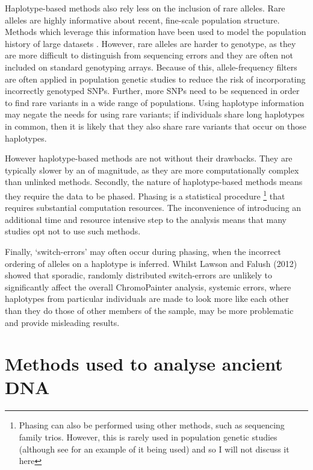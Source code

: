 Haplotype-based methods also rely less on the inclusion of rare alleles. Rare alleles are highly informative about recent, fine-scale population structure. Methods which leverage this information have been used to model the population history of large datasets \cite{schiffels2016iron, gravel2011demographic, o2015rare}. However, rare alleles are harder to genotype, as they are more difficult to distinguish from sequencing errors and they are often not included on standard genotyping arrays. Because of this, allele-frequency filters are often applied in population genetic studies to reduce the risk of incorporating incorrectly genotyped SNPs. Further, more SNPs need to be sequenced in order to find rare variants in a wide range of populations. Using haplotype information may negate the needs for using rare variants; if individuals share long haplotypes in common, then it is likely that they also share rare variants that occur on those haplotypes. 

However haplotype-based methods are not without their drawbacks. They are typically slower by an of magnitude, as they are more computationally complex than unlinked methods. Secondly, the nature of haplotype-based methods means they require the data to be phased. Phasing is a statistical procedure \footnote{Phasing can also be performed using other methods, such as sequencing family trios. However, this is rarely used in population genetic studies (although see \cite{BergstromHGDP} for an example of it being used) and so I will not discuss it here} that requires substantial computation resources. The inconvenience of introducing an additional time and resource intensive step to the analysis means that many studies opt not to use such methods. 

Finally, `switch-errors' may often occur during phasing, when the incorrect ordering of alleles on a haplotype is inferred. Whilst Lawson and Falush (2012) showed that sporadic, randomly distributed switch-errors are unlikely to significantly affect the overall ChromoPainter analysis, systemic errors, where haplotypes from particular individuals are made to look more like each other than they do those of other members of the sample, may be more problematic and provide misleading results\cite{LawsonFalushReview}. 

\section{Methods used to analyse ancient DNA}

